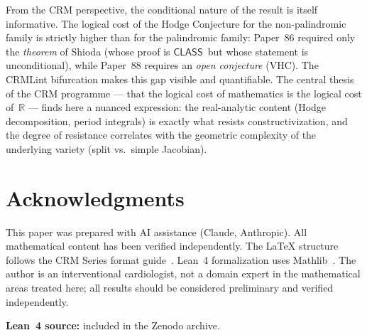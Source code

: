 \documentclass[11pt]{article}
\theoremstyle{plain}
\theoremstyle{definition}
\theoremstyle{remark}
\newcommand{\R}{\mathbb{R}}
\newcommand{\CLASS}{\ensuremath{\mathsf{CLASS}}}
\begin{document}
From the CRM perspective, the conditional nature of the result is
itself informative.  The logical cost of the Hodge Conjecture for
the non-palindromic family is strictly higher than for the
palindromic family: Paper~86 required only the \emph{theorem} of
Shioda (whose proof is \CLASS\ but whose statement is unconditional),
while Paper~88 requires an \emph{open conjecture} (VHC).  The
CRMLint bifurcation makes this gap visible and quantifiable.
The central thesis of the CRM programme --- that the logical cost
of mathematics is the logical cost of~$\R$ --- finds here a
nuanced expression: the real-analytic content (Hodge decomposition,
period integrals) is exactly what resists constructivization, and
the degree of resistance correlates with the geometric complexity
of the underlying variety (split vs.\ simple Jacobian).

\section*{Acknowledgments}

This paper was prepared with AI assistance (Claude, Anthropic).
All mathematical content has been verified independently.
The LaTeX structure follows the CRM Series format
guide~\cite{FormatGuide}.
Lean~4 formalization uses Mathlib~\cite{Mathlib}.
The author is an interventional cardiologist, not a domain expert in the mathematical areas treated here; all results should be considered preliminary and verified independently.

\medskip\noindent
\textbf{Lean~4 source:} included in the Zenodo archive.
\end{document}
